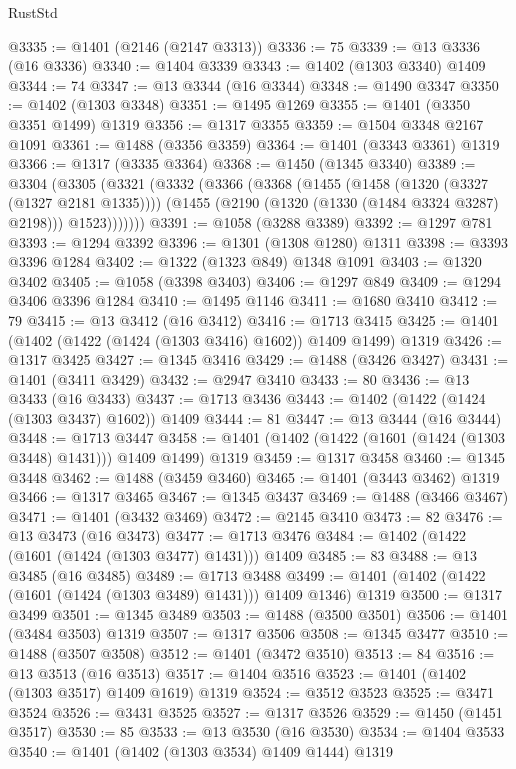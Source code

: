 \begin{lexlean}{RustStd}
\begin{coremodule}
@3335 := @1401 (@2146 (@2147 @3313))
@3336 := 75
@3339 := @13 @3336 (@16 @3336)
@3340 := @1404 @3339
@3343 := @1402 (@1303 @3340) @1409
@3344 := 74
@3347 := @13 @3344 (@16 @3344)
@3348 := @1490 @3347
@3350 := @1402 (@1303 @3348)
@3351 := @1495 @1269
@3355 := @1401 (@3350 @3351 @1499) @1319
@3356 := @1317 @3355
@3359 := @1504 @3348 @2167 @1091
@3361 := @1488 (@3356 @3359)
@3364 := @1401 (@3343 @3361) @1319
@3366 := @1317 (@3335 @3364)
@3368 := @1450 (@1345 @3340)
@3389 := @3304
    (@3305
      (@3321
        (@3332
          (@3366
            (@3368
              (@1455
                (@1458 (@1320 (@3327 (@1327 @2181 @1335))))
                (@1455 (@2190 (@1320 (@1330 (@1484 @3324 @3287) @2198))) @1523)))))))
@3391 := @1058 (@3288 @3389)
@3392 := @1297 @781
@3393 := @1294 @3392
@3396 := @1301 (@1308 @1280) @1311
@3398 := @3393 @3396 @1284
@3402 := @1322 (@1323 @849) @1348 @1091
@3403 := @1320 @3402
@3405 := @1058 (@3398 @3403)
@3406 := @1297 @849
@3409 := @1294 @3406 @3396 @1284
@3410 := @1495 @1146
@3411 := @1680 @3410
@3412 := 79
@3415 := @13 @3412 (@16 @3412)
@3416 := @1713 @3415
@3425 := @1401 (@1402 (@1422 (@1424 (@1303 @3416) @1602)) @1409 @1499) @1319
@3426 := @1317 @3425
@3427 := @1345 @3416
@3429 := @1488 (@3426 @3427)
@3431 := @1401 (@3411 @3429)
@3432 := @2947 @3410
@3433 := 80
@3436 := @13 @3433 (@16 @3433)
@3437 := @1713 @3436
@3443 := @1402 (@1422 (@1424 (@1303 @3437) @1602)) @1409
@3444 := 81
@3447 := @13 @3444 (@16 @3444)
@3448 := @1713 @3447
@3458 := @1401 (@1402 (@1422 (@1601 (@1424 (@1303 @3448) @1431))) @1409 @1499) @1319
@3459 := @1317 @3458
@3460 := @1345 @3448
@3462 := @1488 (@3459 @3460)
@3465 := @1401 (@3443 @3462) @1319
@3466 := @1317 @3465
@3467 := @1345 @3437
@3469 := @1488 (@3466 @3467)
@3471 := @1401 (@3432 @3469)
@3472 := @2145 @3410
@3473 := 82
@3476 := @13 @3473 (@16 @3473)
@3477 := @1713 @3476
@3484 := @1402 (@1422 (@1601 (@1424 (@1303 @3477) @1431))) @1409
@3485 := 83
@3488 := @13 @3485 (@16 @3485)
@3489 := @1713 @3488
@3499 := @1401 (@1402 (@1422 (@1601 (@1424 (@1303 @3489) @1431))) @1409 @1346) @1319
@3500 := @1317 @3499
@3501 := @1345 @3489
@3503 := @1488 (@3500 @3501)
@3506 := @1401 (@3484 @3503) @1319
@3507 := @1317 @3506
@3508 := @1345 @3477
@3510 := @1488 (@3507 @3508)
@3512 := @1401 (@3472 @3510)
@3513 := 84
@3516 := @13 @3513 (@16 @3513)
@3517 := @1404 @3516
@3523 := @1401 (@1402 (@1303 @3517) @1409 @1619) @1319
@3524 := @3512 @3523
@3525 := @3471 @3524
@3526 := @3431 @3525
@3527 := @1317 @3526
@3529 := @1450 (@1451 @3517)
@3530 := 85
@3533 := @13 @3530 (@16 @3530)
@3534 := @1404 @3533
@3540 := @1401 (@1402 (@1303 @3534) @1409 @1444) @1319

\end{coremodule}
\end{lexlean}

